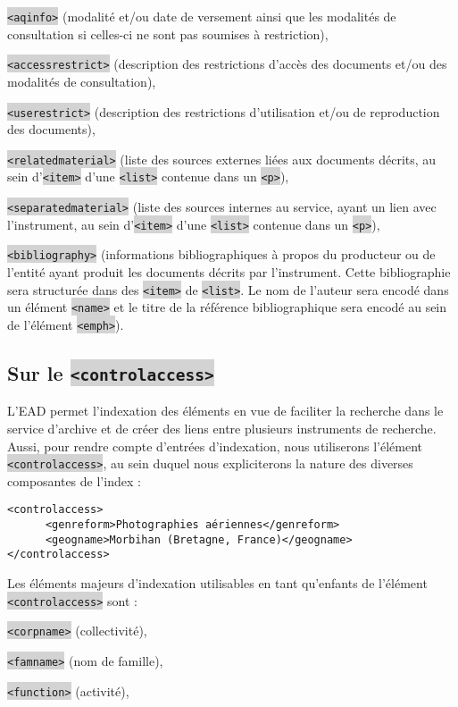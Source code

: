 \documentclass[hidelinks, 13pt]{report}
\newcommand{\code}[1]{\colorbox{LightGray}{\texttt{#1}}}
\begin{document}
	\code{<aqinfo>} (modalité et/ou date de versement ainsi que les modalités de consultation si celles-ci ne sont pas soumises à restriction),
	
	\code{<accessrestrict>} (description des restrictions d'accès des documents et/ou des modalités de consultation),
	
	\code{<userestrict>} (description des restrictions d'utilisation et/ou de reproduction des documents),

	\code{<relatedmaterial>} (liste des sources externes liées aux documents décrits, au sein d'\code{<item>} d'une \code{<list>} contenue dans un \code{<p>}),
	
	\code{<separatedmaterial>} (liste des sources internes au service, ayant un lien avec l'instrument, au sein d'\code{<item>} d'une \code{<list>} contenue dans un \code{<p>}),
	
	\code{<bibliography>} (informations bibliographiques à propos du producteur ou de l'entité ayant produit les documents décrits par l'instrument. Cette bibliographie sera structurée dans des \code{<item>} de \code{<list>}. Le nom de l'auteur sera encodé dans un élément \code{<name>} et le titre de la référence bibliographique sera encodé au sein de l'élément \code{<emph>}).
	
	\subsection{Sur le \code{<controlaccess>}}
	
	L'EAD permet l'indexation des éléments en vue de faciliter la recherche dans le service d'archive et de créer des liens entre plusieurs instruments de recherche. Aussi, pour rendre compte d'entrées d'indexation, nous utiliserons l'élément \code{<controlaccess>}, au sein duquel nous expliciterons la nature des diverses composantes de l'index :
	
\begin{lstlisting}[language=EAD]
<controlaccess>
      <genreform>Photographies aériennes</genreform>
      <geogname>Morbihan (Bretagne, France)</geogname>
</controlaccess>
\end{lstlisting}
	
	Les éléments majeurs d'indexation utilisables en tant qu'enfants de l'élément \code{<controlaccess>} sont :

	\code{<corpname>} (collectivité),
	
	\code{<famname>} (nom de famille),
	
	\code{<function>} (activité),
	
\end{document}
